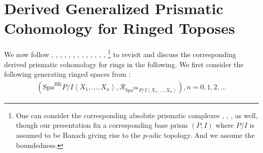\documentclass[12pt]{book}
\begin{document}
\newpage
\section{Derived Generalized Prismatic Cohomology for Ringed Toposes}


We now follow \cite{Grot1}, \cite{Grot2}, \cite{Grot3}, \cite{Grot4}, \cite{BK}, \cite{BBK}, \cite{BBBK}, \cite{BBM}, \cite{KKM}, \cite{T2}, \cite{Sch2}, \cite{BS}, \cite{BL}, \cite{Dr1}\footnote{One can consider the corresponding absolute prismatic complexes \cite{BS}, \cite{BL2}, \cite{BL}, \cite{Dr1} as well, though our presentation fix a corresponding base prism $(P,I)$ where $P/I$ is assumed to be Banach giving rise to the $p$-adic topology. And we assume the boundedness.} to revisit and discuss the corresponding derived prismatic cohomology for rings in the following. We first consider the following generating ringed spaces from \cite{BK}:
\begin{align}
(\mathrm{Spa}^\mathrm{BK}P/I\left<X_1,...,X_n\right>,\mathcal{R}_{\mathrm{Spa}^\mathrm{BK}P/I\left<X_1,...,X_n\right>}),n=0,1,2,...
\end{align}
\end{document}
